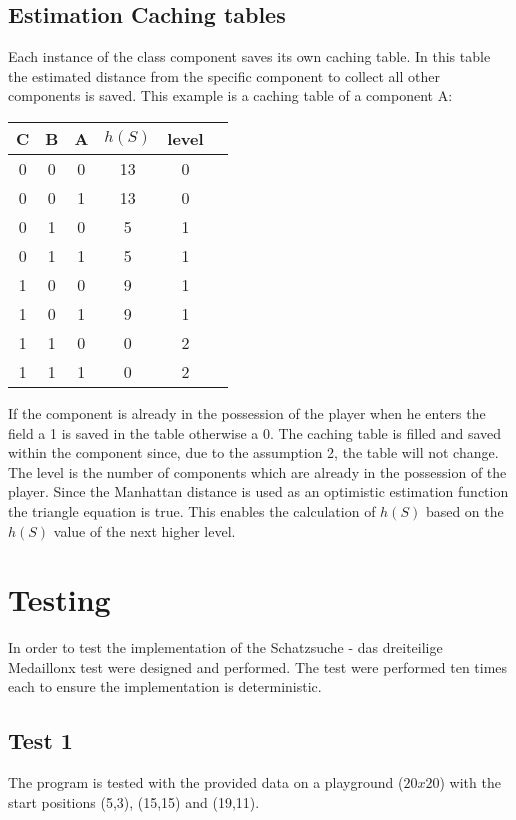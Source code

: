 \documentclass{article}
\newcommand{\problem}{Schatzsuche - das dreiteilige Medaillon}
\begin{document}
\subsection{Estimation Caching tables} \label{estimation_caching_tables}
Each instance of the class component saves its own caching table. In this table the estimated distance from the specific component to collect all other components is saved. This example is a caching table of a component A:\\
\begin{center}
\begin{tabular}{ |c|c|c|c|c|c| } 
 \hline
 C & B & A & $h(S)$ & level \\ 
 \hline
 0 & 0 & 0 & 13 & 0 \\ 
 0 & 0 & 1 & 13 & 0 \\ 
 0 & 1 & 0 & 5 & 1 \\ 
 0 & 1 & 1 & 5 & 1 \\ 
 1 & 0 & 0 & 9 & 1 \\ 
 1 & 0 & 1 & 9 & 1 \\ 
 1 & 1 & 0 & 0 & 2 \\ 
 1 & 1 & 1 & 0 & 2 \\ 
 \hline
\end{tabular}
\label{tab:caching table}
\end{center}
If the component is already in the possession of the player when he enters the field a 1 is saved in the table otherwise a 0. 
The caching table is filled and saved within the component since, due to the assumption 2, the table will not change. 
The level is the number of components which are already in the possession of the player. 
Since the Manhattan distance is used as an optimistic estimation function the triangle equation is true. This enables the calculation of $h(S)$ based on the $h(S)$ value of the next higher level.


\section{Testing}
In order to test the implementation of the \problem x test were designed and performed. The test were performed ten times each to ensure the implementation is deterministic. 

\subsection{Test 1}
The program is tested with the provided data on a  playground ($20 x 20$) with the start positions (5,3), (15,15) and (19,11).
\end{document}
